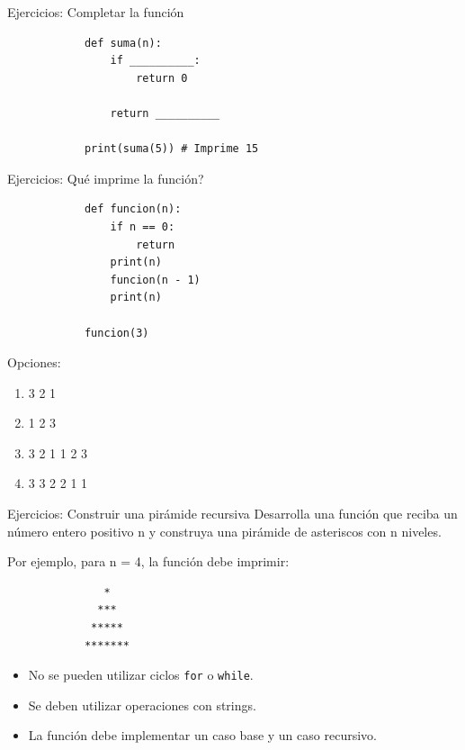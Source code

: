 \documentclass{beamer}
\begin{document}
    \begin{frame}[fragile, t]{Ejercicios: Completar la función}
        \begin{verbatim}
            def suma(n):
                if __________:
                    return 0

                return __________

            print(suma(5)) # Imprime 15
        \end{verbatim}
    \end{frame}

    \begin{frame}[fragile, t]{Ejercicios: Qué imprime la función?}
        \begin{verbatim}
            def funcion(n):
                if n == 0:
                    return
                print(n)
                funcion(n - 1)
                print(n)

            funcion(3)
        \end{verbatim}
        Opciones:
        \begin{enumerate}
            \item 3 2 1
            \item 1 2 3
            \item 3 2 1 1 2 3
            \item 3 3 2 2 1 1
        \end{enumerate}
    \end{frame}

    \begin{frame}[fragile, t]{Ejercicios: Construir una pirámide recursiva}
        Desarrolla una función que reciba un número entero positivo n y construya una pirámide de asteriscos con n niveles.
        
        Por ejemplo, para n = 4, la función debe imprimir:
        \begin{verbatim}
               *
              ***
             *****
            *******
        \end{verbatim}

        \begin{itemize}
            \item No se pueden utilizar ciclos \texttt{for} o \texttt{while}.
            \item Se deben utilizar operaciones con strings.
            \item La función debe implementar un caso base y un caso recursivo.
        \end{itemize}
    \end{frame}
\end{document}
